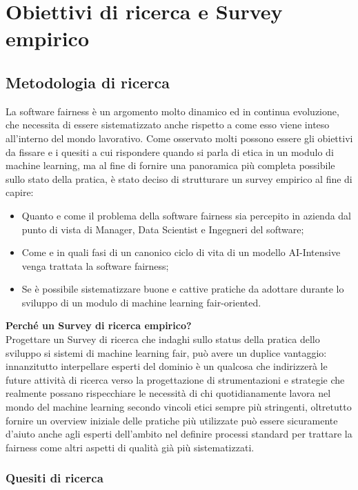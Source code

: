 \chapter{Obiettivi di ricerca e Survey empirico} %
%
    \section{Metodologia di ricerca}
    La software fairness è un argomento molto dinamico ed in continua evoluzione, che necessita di essere sistematizzato anche rispetto a come esso viene inteso all'interno del mondo lavorativo. Come osservato molti possono essere gli obiettivi da fissare e i quesiti a cui rispondere quando si parla di etica in un modulo di machine learning, ma al fine di fornire una panoramica più completa possibile sullo stato della pratica, è stato deciso di strutturare un survey empirico al fine di capire:
    \begin{itemize}
        \item Quanto e come il problema della software fairness sia percepito in azienda dal punto di vista di Manager, Data Scientist e Ingegneri del software;
        \item Come e in quali fasi di un canonico ciclo di vita di un modello AI-Intensive venga trattata la software fairness;
        \item Se è possibile sistematizzare buone e cattive pratiche da adottare durante lo sviluppo di un modulo di machine learning fair-oriented.
    \end{itemize}
    
    \textbf{Perché un Survey di ricerca empirico?}\\
    Progettare un Survey di ricerca che indaghi sullo status della pratica dello sviluppo si sistemi di machine learning fair, può avere un duplice vantaggio: innanzitutto interpellare esperti del dominio è un qualcosa che indirizzerà le future attività di ricerca verso la progettazione di strumentazioni e strategie che realmente possano rispecchiare le necessità di chi quotidianamente lavora nel mondo del machine learning secondo vincoli etici sempre più stringenti, oltretutto fornire un overview iniziale delle pratiche più utilizzate può essere sicuramente d'aiuto anche agli esperti dell'ambito nel definire processi standard per trattare la fairness come altri aspetti di qualità già più sistematizzati.
  
    \subsection{Quesiti di ricerca}
    
